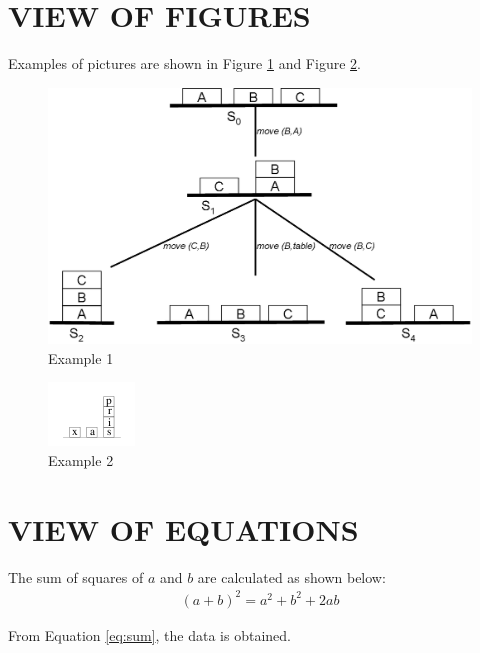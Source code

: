 \section{\uppercase{View of Figures}}
Examples of pictures are shown in Figure \ref{fig:one} and Figure \ref{fig:two}.
\begin{figure}[h]
\begin{center}
\includegraphics[scale=0.6]{3/eg1.png}
\caption{Example 1}
\label{fig:one}
\end{center}
\end{figure}
\begin{figure}[h]
\begin{center}
\includegraphics[scale=2]{3/eg2.png}
\caption{Example 2}
\label{fig:two}
\end{center}
\end{figure}

\section{\uppercase{View of Equations}}
The sum of squares of $a$ and $b$ are calculated as shown below:
\begin{eqnarray}
 \label{eq:sum}
 (a+b)^2 = a^2+b^2+2ab
\end{eqnarray}

From Equation \ref{eq:sum}, the data is obtained.





